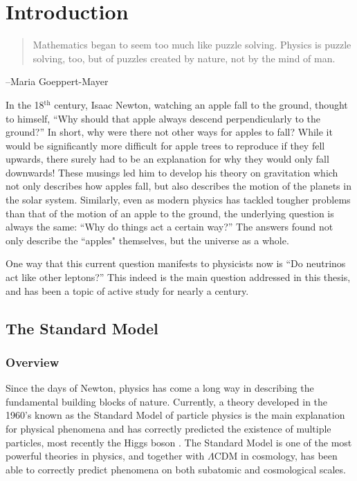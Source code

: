 \chapter{Introduction}
\begin{quote}
Mathematics began to seem too much like puzzle solving. Physics is puzzle solving, too, but of puzzles created by nature, not by the mind of man.
\end{quote}
\begin{flushright}
--Maria Goeppert-Mayer
\end{flushright}

In the 18$^\textrm{th}$ century, Isaac Newton,  watching an apple fall to the ground, thought to himself, ``Why should that apple always descend perpendicularly to the ground?''
In short, why were there not other ways for apples to fall? While it would be significantly more difficult for apple trees to reproduce if they fell upwards, there surely had to be an explanation for why they would only fall downwards!
These musings led him to develop his theory on gravitation which not only describes how apples fall, but also describes the motion of the planets in the solar system.
Similarly, even as modern physics has tackled tougher problems than that of the motion of an apple to the ground, the underlying question is always the same: ``Why do things act a certain way?''
The answers found not only describe the ``apples" themselves, but the universe as a whole.

One way that this current question manifests to physicists now is ``Do neutrinos act like other leptons?''
This indeed is the main question addressed in this thesis, and has been a topic of active study for nearly a century.

\section{The Standard Model}
\subsection{Overview}
Since the days of Newton, physics has come a long way in describing the fundamental building blocks of nature.
Currently, a theory developed in the 1960's known as the Standard Model of particle physics is the main explanation for physical phenomena and has correctly predicted the existence of multiple particles, most recently the Higgs boson \cite{Aad:2012tfa}\cite{Chatrchyan:2012xdj}.
The Standard Model is one of the most powerful theories in physics, and together with $\Lambda$CDM in cosmology, has been able to correctly predict phenomena on both subatomic and cosmological scales.

